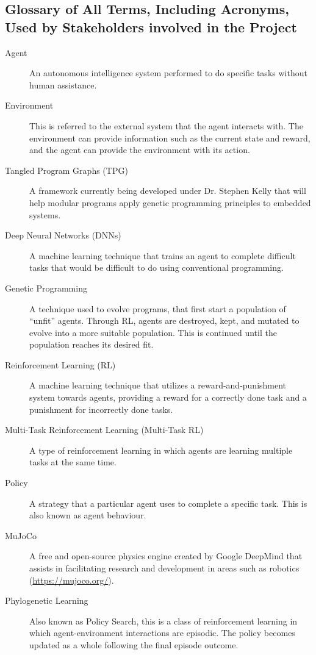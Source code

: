 \documentclass[12pt]{article}
\newcommand{\lips}{\textit{Insert your content here.}}
\begin{document}
\subsection{Glossary of All Terms, Including Acronyms, Used by Stakeholders
involved in the Project}
\begin{description}
  \item [Agent]\label{def:agent} An autonomous intelligence system performed to do specific tasks without human assistance.
  \item [Environment]\label{def:environment} This is referred to the external system that the agent interacts with. The environment can provide information such as the current state and reward, and the agent can provide the environment with its action.
  \item [Tangled Program Graphs (TPG)]\label{def:tpg} A framework currently being developed under Dr. Stephen Kelly that will help modular programs apply genetic programming principles to embedded systems.
  \item [Deep Neural Networks (DNNs)]\label{def:dnn} A machine learning technique that trains an agent to complete difficult tasks that would be difficult to do using conventional programming.
  \item [Genetic Programming]\label{def:genetic_programming} A technique used to evolve programs, that first start a population of “unfit” agents. Through RL, agents are destroyed, kept, and mutated to evolve into a more suitable population. This is continued until the population reaches its desired fit.
  \item [Reinforcement Learning (RL)]\label{def:rl} A machine learning technique that utilizes a reward-and-punishment system towards agents, providing a reward for a correctly done task and a punishment for incorrectly done tasks.
  \item [Multi-Task Reinforcement Learning (Multi-Task RL)]\label{def:mulittask_rl} A type of reinforcement learning in which agents are learning multiple tasks at the same time.
  \item [Policy]\label{def:policy} A strategy that a particular agent uses to complete a specific task. This is also known as agent behaviour. 
  \item [MuJoCo]\label{def:mujoco} A free and open-source physics engine created by Google DeepMind that assists in facilitating research and development in areas such as robotics (\href{https://mujoco.org/}{https://mujoco.org/}).
  \item [Phylogenetic Learning]\label{def:phylogenetic_learning} Also known as Policy Search, this is a class of reinforcement learning in which agent-environment interactions are episodic. The policy becomes updated as a whole following the final episode outcome.

\end{description}
\end{document}

